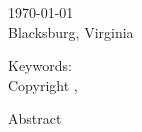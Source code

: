 \documentclass[12pt]{report}
\renewcommand\[{\begin{equation}}
\renewcommand\]{\end{equation}}
\begin{document}
\thispagestyle{empty}


\begin{center}

{\Large
\mytitle
}
\vfill


\myauthor
\vfill


\mycommittee
\vfill

\ifx\mydate\undefined
\def\mydate{\today}
\fi
\mydate \\
\ifx\mydefenselocation\undefined
Blacksburg, Virginia
\else
\fi

\vfill

\ifx\myyear\undefined
\def\myyear{\the\year}
\fi

Keywords: \mykeywords \\
Copyright \myyear, \myauthor

\end{center}

\pagebreak

\thispagestyle{empty}

\begin{center}

{\large \mytitle}
\vfill

\myauthor
\vfill


Abstract
\vfill
\end{center}

\ifdefined \myabstract

\fi

\ifx\mygrants\undefined
\else
  \mygrants
\fi

\pagebreak
\tableofcontents
\pagebreak


\listoffigures
\pagebreak


\listoftables
\pagebreak

\ifdefined\myglossary

\printglossaries
\pagebreak
\fi


\pagestyle{myheadings}

\ifx\mylinespace\undefined
\else
  \mylinespace
\fi
\end{document}
